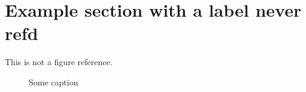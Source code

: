 \documentclass{grattan}
\begin{document}
\section{Example section with a label never refd}
This is not a figure reference.
\begin{figure}
\caption{Some caption}\label{fig:this-lab-not-refd}
\end{figure}
\end{document}
